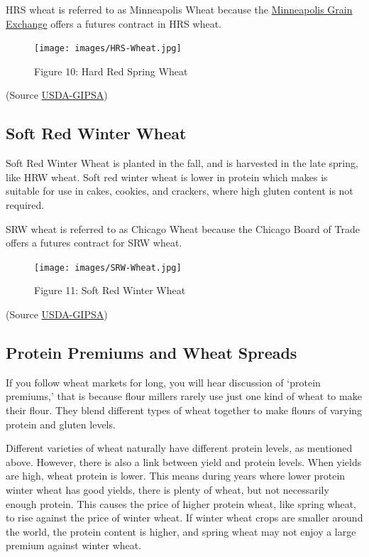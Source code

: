 \documentclass[
]{book}
\begin{document}
HRS wheat is referred to as Minneapolis Wheat because the \href{http://www.mgex.com/}{Minneapolis Grain Exchange} offers a futures contract in HRS wheat.

\begin{figure}
\centering
\texttt{[image: images/HRS-Wheat.jpg]}
\caption{Figure 10: Hard Red Spring Wheat}
\end{figure}

(Source \href{https://www.gipsa.usda.gov/fgis/commgallery/gr_hrs.aspx}{USDA-GIPSA})

\hypertarget{soft-red-winter-wheat}{%
\subsection{Soft Red Winter Wheat}\label{soft-red-winter-wheat}}

Soft Red Winter Wheat is planted in the fall, and is harvested in the late spring, like HRW wheat. Soft red winter wheat is lower in protein which makes is suitable for use in cakes, cookies, and crackers, where high gluten content is not required.

SRW wheat is referred to as Chicago Wheat because the Chicago Board of Trade offers a futures contract for SRW wheat.

\begin{figure}
\centering
\texttt{[image: images/SRW-Wheat.jpg]}
\caption{Figure 11: Soft Red Winter Wheat}
\end{figure}

(Source \href{https://www.gipsa.usda.gov/fgis/commgallery/gr_srw.aspx}{USDA-GIPSA})

\hypertarget{protein-premiums-and-wheat-spreads}{%
\subsection{Protein Premiums and Wheat Spreads}\label{protein-premiums-and-wheat-spreads}}

If you follow wheat markets for long, you will hear discussion of `protein premiums,' that is because flour millers rarely use just one kind of wheat to make their flour. They blend different types of wheat together to make flours of varying protein and gluten levels.

Different varieties of wheat naturally have different protein levels, as mentioned above. However, there is also a link between yield and protein levels. When yields are high, wheat protein is lower. This means during years where lower protein winter wheat has good yields, there is plenty of wheat, but not necessarily enough protein. This causes the price of higher protein wheat, like spring wheat, to rise against the price of winter wheat. If winter wheat crops are smaller around the world, the protein content is higher, and spring wheat may not enjoy a large premium against winter wheat.
\end{document}
